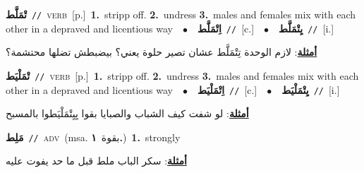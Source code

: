 \documentclass[10pt,a4paper,twoside]{article} %
\begin{document}
\begin{multicols}{2}
{\setlength\topsep{0pt}\textbf{\foreignlanguage{arabic}{تْمَلَّط}}\ {\color{gray}\texttt{//}\color{black}}\ \textsc{verb}\ [p.]\ \textbf{1.}~stripp off.  \textbf{2.}~undress  \textbf{3.}~males and females mix with each other in a depraved and licentious way\ \ $\bullet$\ \ \setlength\topsep{0pt}\textbf{\foreignlanguage{arabic}{اِتْمَلَّط}}\ {\color{gray}\texttt{//}\color{black}}\ [c.]\ \ $\bullet$\ \ \setlength\topsep{0pt}\textbf{\foreignlanguage{arabic}{يِتْمَلَّط}}\ {\color{gray}\texttt{//}\color{black}}\ [i.]\  \begin{flushright}\color{gray}\foreignlanguage{arabic}{\textbf{\underline{\foreignlanguage{arabic}{أمثلة}}}: لازم الوحدة تِتْمَلَّط عشان تصير حلوة يعني؟ بيضبطش تضلها محتشمة؟}\end{flushright}\color{black}} \vspace{2mm}

{\setlength\topsep{0pt}\textbf{\foreignlanguage{arabic}{تْمَلْيَط}}\ {\color{gray}\texttt{//}\color{black}}\ \textsc{verb}\ [p.]\ \textbf{1.}~stripp off.  \textbf{2.}~undress  \textbf{3.}~males and females mix with each other in a depraved and licentious way\ \ $\bullet$\ \ \setlength\topsep{0pt}\textbf{\foreignlanguage{arabic}{اِتْمَلْيَط}}\ {\color{gray}\texttt{//}\color{black}}\ [c.]\ \ $\bullet$\ \ \setlength\topsep{0pt}\textbf{\foreignlanguage{arabic}{يِتْمَلْيَط}}\ {\color{gray}\texttt{//}\color{black}}\ [i.]\  \begin{flushright}\color{gray}\foreignlanguage{arabic}{\textbf{\underline{\foreignlanguage{arabic}{أمثلة}}}: لو شفت كيف الشباب والصبايا بقوا يِيِتْمَلْيَطوا بالمسبح}\end{flushright}\color{black}} \vspace{2mm}

{\setlength\topsep{0pt}\textbf{\foreignlanguage{arabic}{مَلِط}}\ {\color{gray}\texttt{//}\color{black}}\ \textsc{adv}\ \color{gray}(msa. \foreignlanguage{arabic}{بقوة}~\foreignlanguage{arabic}{\textbf{١.}})\color{black}\ \textbf{1.}~strongly\  \begin{flushright}\color{gray}\foreignlanguage{arabic}{\textbf{\underline{\foreignlanguage{arabic}{أمثلة}}}: سكر الباب ملط قبل ما حد يفوت عليه}\end{flushright}\color{black}} \vspace{2mm}


\end{multicols}
\end{document}
